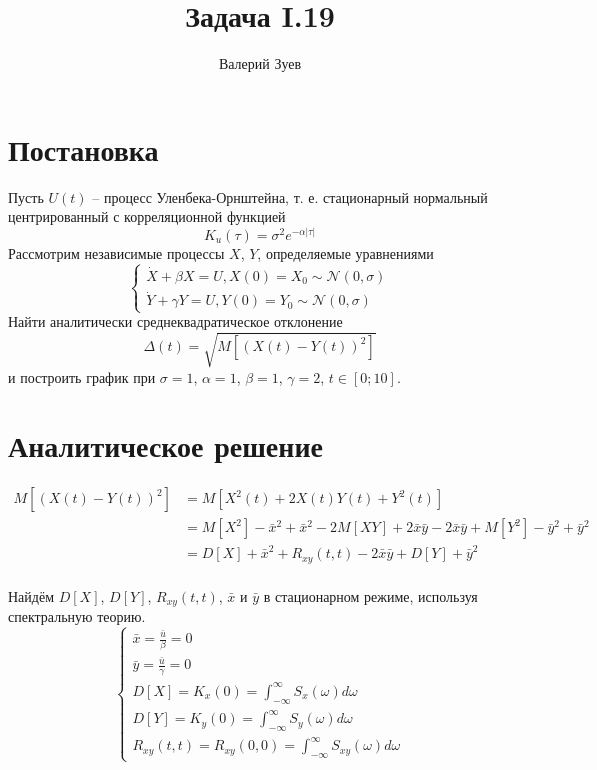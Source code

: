 \documentclass[a4paper,14pt]{extarticle}
\begin{document}
\title{Задача I.19}
\author{Валерий Зуев}
\maketitle

\section{Постановка}

Пусть $U(t)$ -- процесс Уленбека-Орнштейна, т. е. стационарный нормальный центрированный с корреляционной функцией
\[ K_u(\tau) = \sigma^2 e^{-\alpha |\tau|} \]
Рассмотрим независимые процессы $X$, $Y$, определяемые уравнениями
\[ \begin{cases}
    \dot X + \beta X = U, X(0) = X_0 \sim \mathcal{N}(0, \sigma) \\
    \dot Y + \gamma Y = U, Y(0) = Y_0 \sim \mathcal{N}(0, \sigma)
\end{cases} \]
Найти аналитически среднеквадратическое отклонение
\[ \Delta(t) = \sqrt{M\left[ (X(t)-Y(t))^2 \right]} \]
и построить график при $ \sigma=1 $, $ \alpha=1 $, $ \beta=1 $, $ \gamma=2 $, $ t \in [0;10] $.

\section{Аналитическое решение}

\begin{align*}
    M\left[ (X(t)-Y(t))^2 \right] & = M\left[ X^2(t) + 2X(t)Y(t) + Y^2(t) \right] \\
    &= M[X^2] - \bar x^2 + \bar x^2 - 2M[XY] + 2\bar x \bar y - 2\bar x \bar y + M[Y^2] - \bar y^2 + \bar y^2 \\
    &= D[X] + \bar x^2 + R_{xy}(t,t) - 2\bar x \bar y + D[Y] + \bar y^2 \\
\end{align*}

Найдём $ D[X] $, $ D[Y] $, $ R_{xy}(t,t) $, $\bar x$ и $ \bar y $ в стационарном режиме, используя спектральную теорию.
\[ \begin{cases}
    \bar x = \frac{\bar u}{\beta} = 0 \\
    \bar y = \frac{\bar u}{\gamma} = 0 \\
    D[X] = K_x(0) = \int_{-\infty}^\infty S_x(\omega) d\omega \\
    D[Y] = K_y(0) = \int_{-\infty}^\infty S_y(\omega) d\omega \\
    R_{xy}(t,t) = R_{xy}(0,0) = \int_{-\infty}^\infty S_{xy}(\omega) d\omega
\end{cases}\]
\end{document}
